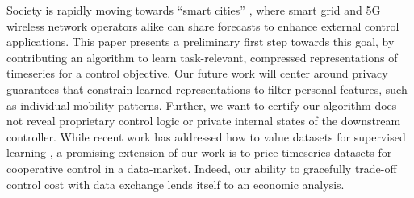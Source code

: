 Society is rapidly moving towards ``smart cities'' \cite{batty2012smart,al2015applications}, where smart grid and 5G wireless network operators alike can share forecasts to enhance external control applications. This paper presents a preliminary first step towards this goal, by contributing an algorithm to learn task-relevant, compressed representations of timeseries for a control objective. 
Our future work will center around privacy guarantees that constrain learned representations to filter personal features, such as individual mobility patterns. Further, we want to certify our algorithm does not reveal proprietary control logic or private internal states of the downstream controller. While recent work has addressed how to value datasets for supervised learning \cite{ghorbani2019data,agarwal2019marketplace}, a promising extension of our work is to price timeseries datasets for cooperative control in a data-market. Indeed, our ability to gracefully trade-off control cost with data exchange lends itself to an economic analysis. %
